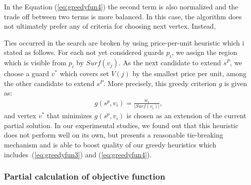 \documentclass[runningheads,a4paper]{elsarticle}
\begin{document}
	
	In the Equation  (\ref{eq:greedyfun4}) the second term is also normalized and the trade off between two terms is more balanced.
	In this case, the algorithm does not  ultimately prefer any of criteria for choosing next vertex. Instead,  
	
	
	Ties occurred in the search are broken by using  price-per-unit heuristic which i stated as follows.
	For each not yet considered guards $p_i$, we assign the region which is visible from $p_i$ by $Surf(v_j)$. As the next candidate to extend $s^P$, we choose a guard $v^*$ which covers set $V(j)$ by the smallest price per unit, among the other candidate to extend $s^P$. More precisely, this greedy criterion $g$ is given as:
	\begin{align}
	g(s^p, v_i) = \frac{w_{i}}{|Surf({v_i})|},
	\end{align}
	and vertex $v^*$ that minimizes $g(s^p, v_i)$ is chosen as an extension of the current partial solution.
	In our experimental studies, we found out that this heuristic does not perform well on its own, but presents a reasonable tie-breaking mechanism and is able to boost quality of our greedy heuristics which includes~(\ref{eq:greedyfun3}) and (\ref{eq:greedyfun4}).
	\subsubsection{Partial calculation of objective function}
	
\end{document}
